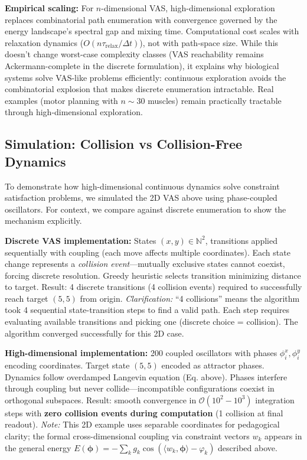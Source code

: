 \documentclass[12pt]{article}
\begin{document}
\textbf{Empirical scaling:} For $n$-dimensional VAS, high-dimensional exploration replaces combinatorial path enumeration with convergence governed by the energy landscape's spectral gap and mixing time. Computational cost scales with relaxation dynamics ($O(n \tau_{\text{relax}}/\Delta t)$), not with path-space size. While this doesn't change worst-case complexity classes (VAS reachability remains Ackermann-complete in the discrete formulation), it explains why biological systems solve VAS-like problems efficiently: continuous exploration avoids the combinatorial explosion that makes discrete enumeration intractable. Real examples (motor planning with $n \sim 30$ muscles) remain practically tractable through high-dimensional exploration.

\subsection{Simulation: Collision vs Collision-Free Dynamics}

To demonstrate how high-dimensional continuous dynamics solve constraint satisfaction problems, we simulated the 2D VAS above using phase-coupled oscillators. For context, we compare against discrete enumeration to show the mechanism explicitly.

\textbf{Discrete VAS implementation:} States $(x,y) \in \mathbb{N}^2$, transitions applied sequentially with coupling (each move affects multiple coordinates). Each state change represents a \textit{collision event}---mutually exclusive states cannot coexist, forcing discrete resolution. Greedy heuristic selects transition minimizing distance to target. Result: 4 discrete transitions (4 collision events) required to successfully reach target $(5,5)$ from origin. \textit{Clarification:} ``4 collisions'' means the algorithm took 4 sequential state-transition steps to find a valid path. Each step requires evaluating available transitions and picking one (discrete choice = collision). The algorithm converged successfully for this 2D case.

\textbf{High-dimensional implementation:} 200 coupled oscillators with phases $\phi_i^x, \phi_i^y$ encoding coordinates. Target state $(5,5)$ encoded as attractor phases. Dynamics follow overdamped Langevin equation (Eq. above). Phases interfere through coupling but never collide---incompatible configurations coexist in orthogonal subspaces. Result: smooth convergence in $\mathcal{O}(10^2\!-\!10^3)$ integration steps with \textbf{zero collision events during computation} (1 collision at final readout). \textit{Note:} This 2D example uses separable coordinates for pedagogical clarity; the formal cross-dimensional coupling via constraint vectors $w_k$ appears in the general energy $E(\boldsymbol{\phi}) = -\sum_k g_k \cos(\langle w_k, \boldsymbol{\phi} \rangle - \varphi_k)$ described above.
\end{document}
